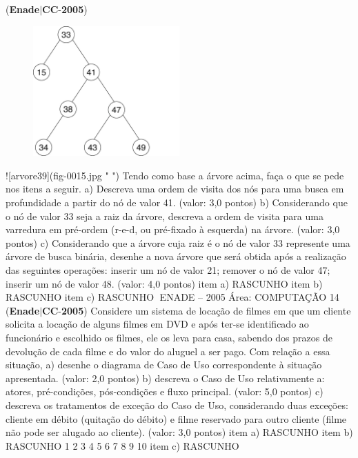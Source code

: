 \documentclass{exam}
\begin{document}
\begin{questions}
\question (\textbf{Enade}$|$\textbf{CC}-\textbf{2005}) \begin{figure}[H]
	\begin{center}
		\includegraphics[width=0.5\textwidth]{CIENCIA_DA_COMPUTACAO_Prova2005-utf8_figuras/fig-0015.jpg}
		\caption{ }
	\end{center}
\end{figure}
![arvore39](fig-0015.jpg " ")
Tendo como base a árvore acima, faça o que se pede nos itens a seguir.
a) Descreva uma ordem de visita dos nós para uma busca em profundidade a partir do nó de valor 41. (valor: 3,0 pontos)
b) Considerando que o nó de valor 33 seja a raiz da árvore, descreva a ordem de visita para uma varredura em pré-ordem
(r-e-d, ou pré-fixado à esquerda) na árvore. (valor: 3,0 pontos)
c) Considerando que a árvore cuja raiz é o nó de valor 33 represente uma árvore de busca binária, desenhe a nova árvore que será
obtida após a realização das seguintes operações: inserir um nó de valor 21; remover o nó de valor 47; inserir um nó de valor 48.
(valor: 4,0 pontos)
item a) RASCUNHO
item b) RASCUNHO
item c) RASCUNHO
ENADE – 2005 Área: COMPUTAÇÃO 14
\question (\textbf{Enade}$|$\textbf{CC}-\textbf{2005}) Considere um sistema de locação de filmes em que um cliente solicita a locação de alguns filmes em DVD e após ter-se
identificado ao funcionário e escolhido os filmes, ele os leva para casa, sabendo dos prazos de devolução de cada filme e do
valor do aluguel a ser pago.
Com relação a essa situação,
a) desenhe o diagrama de Caso de Uso correspondente à situação apresentada. (valor: 2,0 pontos)
b) descreva o Caso de Uso relativamente a: atores, pré-condições, pós-condições e fluxo principal. (valor: 5,0 pontos)
c) descreva os tratamentos de exceção do Caso de Uso, considerando duas exceções: cliente em débito (quitação do débito) e filme
reservado para outro cliente (filme não pode ser alugado ao cliente). (valor: 3,0 pontos)
item a) RASCUNHO
item b) RASCUNHO
1
2
3
4
5
6
7
8
9
10
item c) RASCUNHO

\end{questions}
\end{document}

